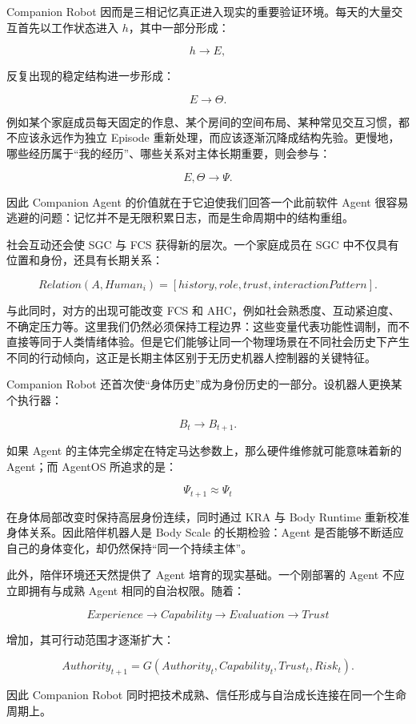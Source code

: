 Companion Robot 因而是三相记忆真正进入现实的重要验证环境。每天的大量交互首先以工作状态进入 $h$，其中一部分形成：

$$
h\rightarrow E,
$$

反复出现的稳定结构进一步形成：

$$
E\rightarrow\Theta.
$$

例如某个家庭成员每天固定的作息、某个房间的空间布局、某种常见交互习惯，都不应该永远作为独立 Episode 重新处理，而应该逐渐沉降成结构先验。更慢地，哪些经历属于“我的经历”、哪些关系对主体长期重要，则会参与：

$$
E,\Theta\rightarrow\Psi.
$$

因此 Companion Agent 的价值就在于它迫使我们回答一个此前软件 Agent 很容易逃避的问题：记忆并不是无限积累日志，而是生命周期中的结构重组。

社会互动还会使 SGC 与 FCS 获得新的层次。一个家庭成员在 SGC 中不仅具有位置和身份，还具有长期关系：

$$
Relation(A,Human_i)=
[
history,
role,
trust,
interactionPattern
].
$$

与此同时，对方的出现可能改变 FCS 和 AHC，例如社会熟悉度、互动紧迫度、不确定压力等。这里我们仍然必须保持工程边界：这些变量代表功能性调制，而不直接等同于人类情绪体验。但是它们能够让同一个物理场景在不同社会历史下产生不同的行动倾向，这正是长期主体区别于无历史机器人控制器的关键特征。

Companion Robot 还首次使“身体历史”成为身份历史的一部分。设机器人更换某个执行器：

$$
B_t\rightarrow B_{t+1}.
$$

如果 Agent 的主体完全绑定在特定马达参数上，那么硬件维修就可能意味着新的 Agent；而 AgentOS 所追求的是：

$$
\Psi_{t+1}\approx\Psi_t
$$

在身体局部改变时保持高层身份连续，同时通过 KRA 与 Body Runtime 重新校准身体关系。因此陪伴机器人是 Body Scale 的长期检验：Agent 是否能够不断适应自己的身体变化，却仍然保持“同一个持续主体”。

此外，陪伴环境还天然提供了 Agent 培育的现实基础。一个刚部署的 Agent 不应立即拥有与成熟 Agent 相同的自治权限。随着：

$$
Experience
\rightarrow
Capability
\rightarrow
Evaluation
\rightarrow
Trust
$$

增加，其可行动范围才逐渐扩大：

$$
Authority_{t+1}
=
G(
Authority_t,
Capability_t,
Trust_t,
Risk_t
).
$$

因此 Companion Robot 同时把技术成熟、信任形成与自治成长连接在同一个生命周期上。

